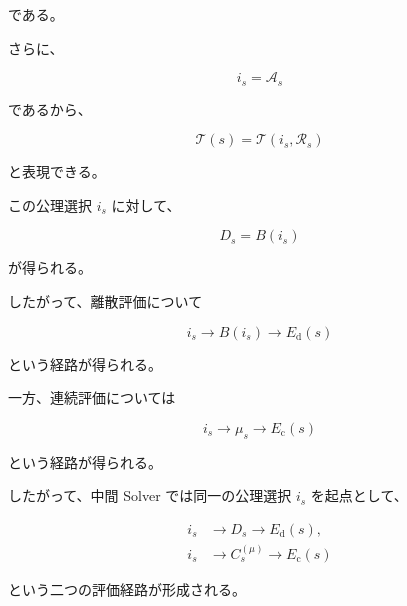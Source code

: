 \documentclass[a4paper,11pt]{article}
\begin{document}
である。

さらに、

\begin{equation}
    i_s=\mathcal{A}_s
\end{equation}

であるから、

\begin{equation}
    \boxed{
        \mathcal{T}(s)
        =
        \mathcal{T}(i_s,\mathcal{R}_s)
    }
    \label{eq:H-theory-path}
\end{equation}

と表現できる。

この公理選択 $i_s$ に対して、

\begin{equation}
    D_s=B(i_s)
\end{equation}

が得られる。

したがって、離散評価について

\begin{equation}
    \boxed{
        i_s
        \longrightarrow
        B(i_s)
        \longrightarrow
        E_{\mathrm d}(s)
    }
    \label{eq:H-discrete-path}
\end{equation}

という経路が得られる。

一方、連続評価については

\begin{equation}
    \boxed{
        i_s
        \longrightarrow
        \mu_s
        \longrightarrow
        E_{\mathrm c}(s)
    }
    \label{eq:H-continuous-path}
\end{equation}

という経路が得られる。

したがって、中間 Solver では同一の公理選択 $i_s$ を起点として、

\begin{equation}
    \boxed{
    \begin{aligned}
        i_s
        &\longrightarrow
        D_s
        \longrightarrow
        E_{\mathrm d}(s),
        \\[2mm]
        i_s
        &\longrightarrow
        C_s^{(\mu)}
        \longrightarrow
        E_{\mathrm c}(s)
    \end{aligned}
    }
    \label{eq:H-two-evaluation-paths}
\end{equation}

という二つの評価経路が形成される。


\end{document}
